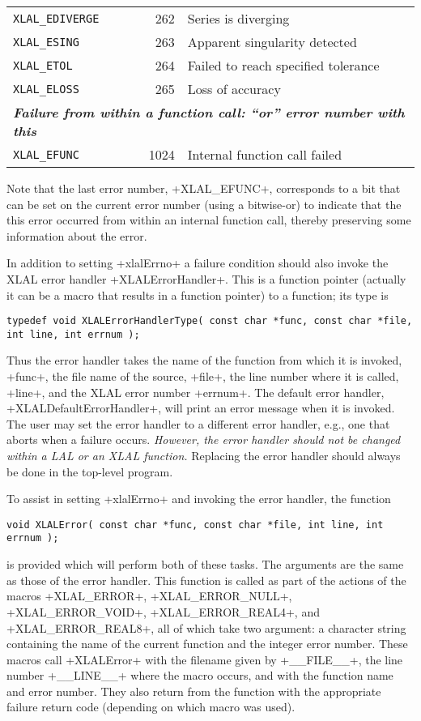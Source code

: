 \documentclass[10pt]{ligodcc}
\makeatletter
\def\verb{\relax\ifmmode\hbox\else\leavevmode\null\fi
  \bgroup
    \color{blue}\small
    \verb@eol@error \let\do\@makeother \dospecials
    \verbatim@font\@noligs
    \@ifstar\@sverb\@verb}
\makeatother
\begin{document}
\begin{center}
\begin{tabular}{|lrl|}
\tt XLAL\_EDIVERGE   &   262 & Series is diverging \\
\tt XLAL\_ESING      &   263 & Apparent singularity detected \\
\tt XLAL\_ETOL       &   264 & Failed to reach specified tolerance \\
\tt XLAL\_ELOSS      &   265 & Loss of accuracy \\
\multicolumn{3}{|l|}{\bfseries\itshape Failure from within a function call: ``or'' error number with this} \\
\tt XLAL\_EFUNC      &  1024 & Internal function call failed \\
\hline
\end{tabular}
\end{center}
Note that the last error number, \verb+XLAL_EFUNC+, corresponds to a bit that
can be set on the current error number (using a bitwise-or) to indicate that
the this error occurred from within an internal function call, thereby
preserving some information about the error.

In addition to setting \verb+xlalErrno+ a failure condition should also invoke
the XLAL error handler \verb+XLALErrorHandler+.  This is a function pointer
(actually it can be a macro that results in a function pointer) to a function;
its type is
\begin{verbatim}
typedef void XLALErrorHandlerType( const char *func, const char *file, int line, int errnum );
\end{verbatim}
Thus the error handler takes the name of the function from which it is
invoked, \verb+func+, the file name of the source, \verb+file+, the
line number where it is called, \verb+line+, and the XLAL error number
\verb+errnum+.  The default error handler, \verb+XLALDefaultErrorHandler+,
will print an error message when it is invoked.  The user may set the error
handler to a different error handler, e.g., one that aborts when a failure
occurs.  \emph{However, the error handler should not be changed within a
LAL or an XLAL function.}  Replacing the error handler should always be
done in the top-level program.

To assist in setting \verb+xlalErrno+ and invoking the error handler,
the function
\begin{verbatim}
void XLALError( const char *func, const char *file, int line, int errnum );
\end{verbatim}
is provided which will perform both of these tasks.  The arguments are the same
as those of the error handler.  This function is called as part of the
actions of the macros \verb+XLAL_ERROR+, \verb+XLAL_ERROR_NULL+,
\verb+XLAL_ERROR_VOID+, \verb+XLAL_ERROR_REAL4+, and \verb+XLAL_ERROR_REAL8+,
all of which take two argument: a character string containing the name of
the current function and the integer error number.  These macros call
\verb+XLALError+ with the filename given by \verb+__FILE__+, the line number
\verb+__LINE__+ where the macro occurs, and with the function name and error
number.  They also return from the function with the appropriate failure
return code (depending on which macro was used).
\end{document}
